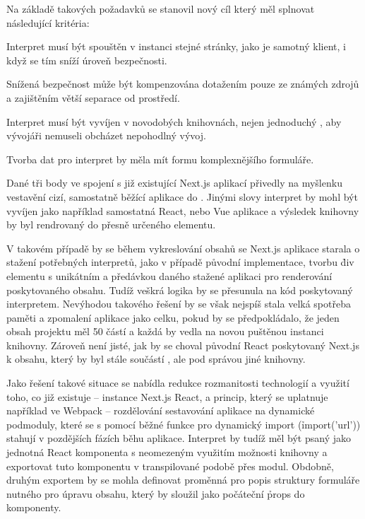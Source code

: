Na základě takových požadavků se stanovil nový cíl který měl splnovat následující kritéria:

\begin{ul}
   \item Interpret musí být spouštěn v instanci stejné stránky, jako je samotný klient, i když se tím sníží úroveň bezpečnosti.
   \item Snížená bezpečnost může být kompenzována dotažením pouze ze známých zdrojů a zajištěním větší separace od prostředí.
   \item Interpret musí být vyvíjen v novodobých knihovnách, nejen jednoduchý , aby vývojáři nemuseli obcházet nepohodlný vývoj.
   \item Tvorba dat pro interpret by měla mít formu komplexnějšího formuláře.
\end{ul}

Dané tři body ve spojení s již existující Next.js aplikací přivedly na myšlenku vestavění cizí, samostatně běžící aplikace do .
Jinými slovy interpret by mohl být vyvíjen jako například samostatná React, nebo Vue aplikace a výsledek knihovny by byl rendrovaný do přesně určeného  elementu.

V takovém případě by se během vykreslování obsahů se Next.js aplikace starala o stažení potřebných interpretů, jako v případě původní implementace, tvorbu \h{div} elementu s unikátním  a předávkou daného  stažené aplikaci pro renderování poskytovaného obsahu.
Tudíž veškrá logika by se přesunula na  kód poskytovaný interpretem.
Nevýhodou takového řešení by se však nejspíš stala velká spotřeba paměti a zpomalení aplikace jako celku, pokud by se předpokládalo, že jeden obsah projektu měl 50 částí a každá by vedla na novou puštěnou instanci knihovny.
Zároveň není jisté, jak by se choval původní React poskytovaný Next.js k obsahu, který by byl stále součástí , ale pod správou jiné knihovny.

Jako řešení takové situace se nabídla redukce rozmanitosti technologií a využití toho, co již existuje – instance Next.js React, a princip, který se uplatnuje například ve Webpack – rozdělování sestavování aplikace na dynamické podmoduly, které se s pomocí běžné  funkce pro dynamický import (\h{import('url')}) stahují v pozdějších fázích běhu aplikace.
Interpret by tudíž měl být psaný jako jednotná React komponenta s neomezeným využitím možnosti knihovny a exportovat tuto komponentu v transpilované podobě přes  modul.
Obdobně, druhým exportem by se mohla definovat proměnná pro popis struktury formuláře nutného pro úpravu obsahu, který by sloužil jako počáteční \h{props} do komponenty.

